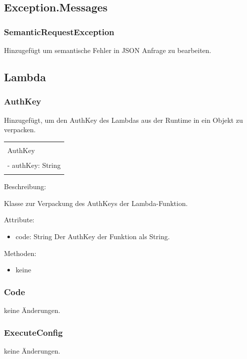 \documentclass[a4paper,20pt,oneside]{book}
\begin{document}
	\subsection{Exception.Messages}
	\subsubsection{SemanticRequestException}
	Hinzugefügt um semantische Fehler in JSON Anfrage zu bearbeiten. 
	\subsection{Lambda}
	
	\subsubsection{AuthKey}
	
	Hinzugefügt, um den AuthKey des Lambdas aus der Runtime in ein Objekt zu verpacken.	
	
		\centering
	\begin{tabular}{|l|}
	\hline \\
	AuthKey\\
	\hline \\
    - authKey: String\\
    \hline \\
	\hline 
	\end{tabular}
	
	\raggedright
	\vspace{0.5cm}
	Beschreibung:
	
	Klasse zur Verpackung des AuthKeys der Lambda-Funktion.
	
	\vspace{0.5cm}
	Attribute:
	\begin{itemize}
    \item code: String \linebreak
    Der AuthKey der Funktion als String.
	\end{itemize}
	
	Methoden:
	\begin{itemize}
	\item keine
	\end{itemize}
	\subsubsection{Code}
	keine Änderungen.
	\subsubsection{ExecuteConfig}
	keine Änderungen.
\end{document}
